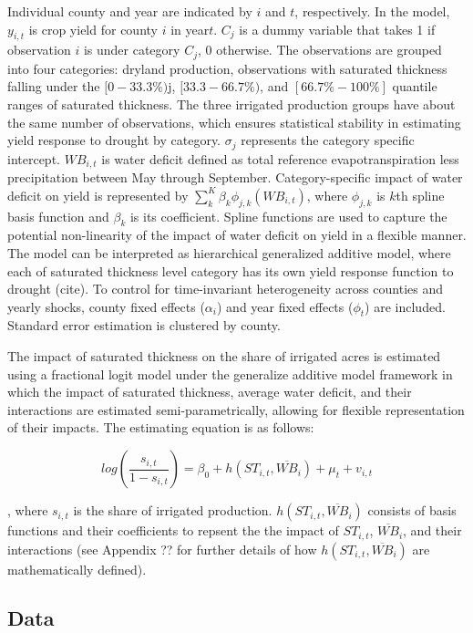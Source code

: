 \documentclass[
]{article}
\begin{document}
Individual county and year are indicated by \(i\) and \(t\), respectively. In the model, \(y_{i,t}\) is crop yield for county \(i\) in year\(t\). \(C_j\) is a dummy variable that takes 1 if observation \(i\) is under category \(C_j\), 0 otherwise. The observations are grouped into four categories: dryland production, observations with saturated thickness falling under the \([0-33.3\%)\)j, \([33.3-66.7\%)\), and \([66.7\% - 100\%]\) quantile ranges of saturated thickness. The three irrigated production groups have about the same number of observations, which ensures statistical stability in estimating yield response to drought by category. \(\sigma_j\) represents the category specific intercept. \(WB_{i,t}\) is water deficit defined as total reference evapotranspiration less precipitation between May through September. Category-specific impact of water deficit on yield is represented by \(\sum_{k}^K \beta_k\phi_{j,k}(WB_{i,t})\), where \(\phi_{j,k}\) is \(k\)th spline basis function and \(\beta_k\) is its coefficient. Spline functions are used to capture the potential non-linearity of the impact of water deficit on yield in a flexible manner. The model can be interpreted as hierarchical generalized additive model, where each of saturated thickness level category has its own yield response function to drought (cite). To control for time-invariant heterogeneity across counties and yearly shocks, county fixed effects (\(\alpha_i\)) and year fixed effects (\(\phi_t\)) are included. Standard error estimation is clustered by county.

The impact of saturated thickness on the share of irrigated acres is estimated using a fractional logit model under the generalize additive model framework in which the impact of saturated thickness, average water deficit, and their interactions are estimated semi-parametrically, allowing for flexible representation of their impacts. The estimating equation is as follows:

\[
log(\frac{s_{i,t}}{1-s_{i,t}}) = \beta_0 + h(ST_{i,t}, \overline{WB}_i) + \mu_t + v_{i,t}
\]

, where \(s_{i,t}\) is the share of irrigated production. \(h(ST_{i,t}, \overline{WB}_i)\) consists of basis functions and their coefficients to repsent the the impact of \(ST_{i,t}\), \(\overline{WB}_i\), and their interactions (see Appendix ?? for further details of how \(h(ST_{i,t}, \overline{WB}_i)\) are mathematically defined).

\hypertarget{data}{%
\subsection{Data}\label{data}}
\end{document}
